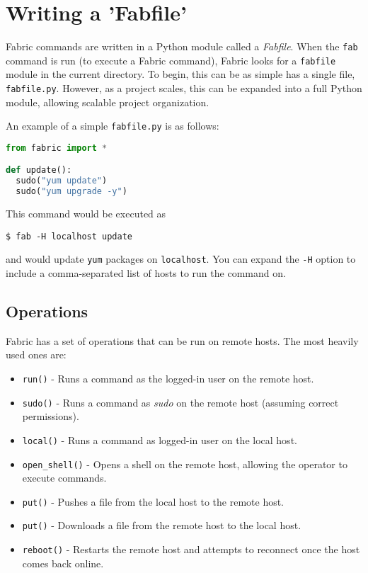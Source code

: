 \documentclass[9pt,twocolumn,twoside]{idsi}
\begin{document}
\section{Writing a 'Fabfile'}
Fabric commands are written in a Python module called a \emph{Fabfile}. When the \texttt{fab} command is run (to execute a Fabric command), Fabric looks for a \texttt{fabfile} module in the current directory. To begin, this can be as simple has a single file, \texttt{fabfile.py}. However, as a project scales, this can be expanded into a full Python module, allowing scalable project organization.

An example of a simple \texttt{fabfile.py} is as follows:

\begin{lstlisting}[language=Python, showstringspaces=false]
from fabric import *

def update():
  sudo("yum update")
  sudo("yum upgrade -y")
\end{lstlisting}

This command would be executed as
\begin{verbatim}
$ fab -H localhost update
\end{verbatim}
and would update \texttt{yum} packages on \texttt{localhost}. You can expand the \texttt{-H} option to include a comma-separated list of hosts to run the command on.

\subsection{Operations}

Fabric has a set of operations that can be run on remote hosts. The most heavily used ones are:
\begin{itemize}
  \item \texttt{run()} - Runs a command as the logged-in user on the remote host.
  \item \texttt{sudo()} - Runs a command as \emph{sudo} on the remote host (assuming correct permissions).
  \item \texttt{local()} - Runs a command as logged-in user on the local host.
  \item \texttt{open\_shell()} - Opens a shell on the remote host, allowing the operator to execute commands.
  \item \texttt{put()} - Pushes a file from the local host to the remote host.
  \item \texttt{put()} - Downloads a file from the remote host to the local host.
  \item \texttt{reboot()} - Restarts the remote host and attempts to reconnect once the host comes back online.
\end{itemize}
\end{document}
